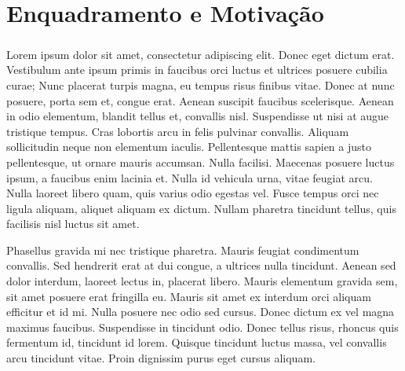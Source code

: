 \chapter*{\thechapter \quad Enquadramento e Motivação}
\paragraph{}
Lorem ipsum dolor sit amet, consectetur adipiscing elit. Donec eget dictum erat. Vestibulum ante ipsum primis in faucibus orci luctus et ultrices posuere cubilia curae; Nunc placerat turpis magna, eu tempus risus finibus vitae. Donec at nunc posuere, porta sem et, congue erat. Aenean suscipit faucibus scelerisque. Aenean in odio elementum, blandit tellus et, convallis nisl. Suspendisse ut nisi at augue tristique tempus. Cras lobortis arcu in felis pulvinar convallis. Aliquam sollicitudin neque non elementum iaculis. Pellentesque mattis sapien a justo pellentesque, ut ornare mauris accumsan. Nulla facilisi. Maecenas posuere luctus ipsum, a faucibus enim lacinia et. Nulla id vehicula urna, vitae feugiat arcu. Nulla laoreet libero quam, quis varius odio egestas vel. Fusce tempus orci nec ligula aliquam, aliquet aliquam ex dictum. Nullam pharetra tincidunt tellus, quis facilisis nisl luctus sit amet.

Phasellus gravida mi nec tristique pharetra. Mauris feugiat condimentum convallis. Sed hendrerit erat at dui congue, a ultrices nulla tincidunt. Aenean sed dolor interdum, laoreet lectus in, placerat libero. Mauris elementum gravida sem, sit amet posuere erat fringilla eu. Mauris sit amet ex interdum orci aliquam efficitur et id mi. Nulla posuere nec odio sed cursus. Donec dictum ex vel magna maximus faucibus. Suspendisse in tincidunt odio. Donec tellus risus, rhoncus quis fermentum id, tincidunt id lorem. Quisque tincidunt luctus massa, vel convallis arcu tincidunt vitae. Proin dignissim purus eget cursus aliquam.

